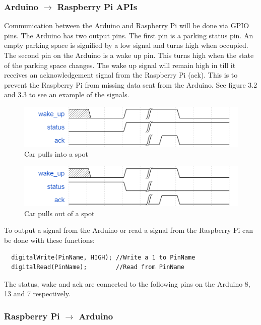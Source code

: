 \documentclass[paper=a4, fontsize=12pt]{scrartcl}
\numberwithin{equation}{section}		%
\numberwithin{figure}{section}			%
\numberwithin{table}{section}				%
\begin{document}
\subsubsection{Arduino $\rightarrow$ Raspberry Pi APIs}
Communication between the Arduino and Raspberry Pi will be done via GPIO pins. The Arduino has two output pins. The first pin is a parking status pin. An empty parking space is signified by a low signal and turns high when occupied. The second pin on the Arduino is a wake up pin. This turns high when the state of the parking space changes. The wake up signal will remain high in till it receives an acknowledgement signal from the Raspberry Pi (ack). This is to prevent the Raspberry Pi from missing data sent from the Arduino. See figure 3.2 and 3.3 to see an example of the signals. 

\begin{figure}[h]
\includegraphics[width=5in]{not_taken_to_taken.png}
\caption{Car pulls into a spot}
\end{figure}

\begin{figure}[h]
\includegraphics[width=5in]{taken_to_not_taken.png}
\caption{Car pulls out of a spot}
\end{figure}

To output a signal from the Arduino or read a signal from the Raspberry Pi can be done with these functions:
\begin{verbatim}
  digitalWrite(PinName, HIGH); //Write a 1 to PinName
  digitalRead(PinName);        //Read from PinName
\end{verbatim}
The status, wake and ack are connected to the following pins on the Arduino 8, 13 and 7 respectively. 

\subsubsection{Raspberry Pi $\rightarrow$ Arduino}
\end{document}
